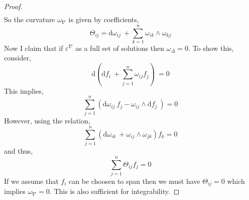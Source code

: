 \documentclass[12pt]{extarticle}
\renewcommand{\d}[1]{ \mathrm{d}#1 \:}
\theoremstyle{definition}
\begin{document}
\begin{proof}
\begin{align*}
\end{align*}
So the curvature $\omega_\nabla$ is given by coefficients,
\[ \Theta_{ij} = \d{\omega_{ij}} + \sum_{k = 1}^n \omega_{ik} \wedge \omega_{kj} \]
Now I claim that if $\varepsilon^{\nabla}$ as a full set of solutions then $\omega_\Delta = 0$. To show this, consider,
\[ \d{\left( \d{f_i} + \sum_{j = 1}^n \omega_{ij} f_j \right)} = 0 \]
This implies,
\[ \sum_{j = 1}^n \left( \d{\omega_{ij}} f_j - \omega_{ij} \wedge \d{f_j} \right) = 0 \]
However, using the relation,
\[ \sum_{j = 1}^n \left( \d{\omega_{ik}} + \omega_{ij} \wedge \omega_{jk} \right) f_k = 0 \]
and thus,
\[ \sum_{j = 1}^n \Theta_{ij} f_j = 0 \]
If we assume that $f_i$ can be choosen to span then we must have $\Theta_{ij} = 0$ which implies $\omega_\nabla = 0$. This is also sufficient for integrability. 
\end{proof}
\end{document}
